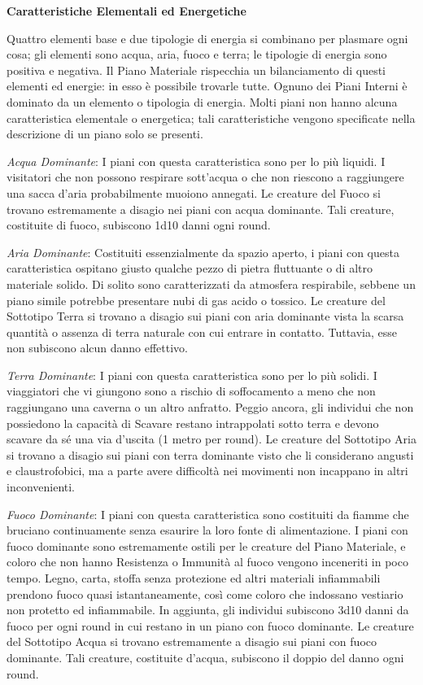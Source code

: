 \documentclass[a4paper,twoside,openany]{book}
\begin{document}
\begin{multicols}{2}
\medskip

\textbf{Caratteristiche Elementali ed Energetiche}

\medskip

Quattro elementi base e due tipologie di energia si combinano per plasmare ogni cosa; gli elementi sono acqua, aria, fuoco e terra; le tipologie di energia sono positiva e negativa. Il Piano Materiale rispecchia un bilanciamento di questi elementi ed energie: in esso è possibile trovarle tutte. Ognuno dei Piani Interni è dominato da un elemento o tipologia di energia. Molti piani non hanno alcuna caratteristica elementale o energetica; tali caratteristiche vengono specificate nella descrizione di un piano solo se presenti.

\emph{Acqua Dominante}: I piani con questa caratteristica sono per lo più liquidi. I visitatori che non possono respirare sott'acqua o che non riescono a raggiungere una sacca d'aria probabilmente muoiono annegati. Le creature del Fuoco si trovano estremamente a disagio nei piani con acqua dominante. Tali creature, costituite di fuoco, subiscono 1d10 danni ogni round.

\emph{Aria Dominante}: Costituiti essenzialmente da spazio aperto, i piani con questa caratteristica ospitano giusto qualche pezzo di pietra fluttuante o di altro materiale solido. Di solito sono caratterizzati da atmosfera respirabile, sebbene un piano simile potrebbe presentare nubi di gas acido o tossico. Le creature del Sottotipo Terra si trovano a disagio sui piani con aria dominante vista la scarsa quantità o assenza di terra naturale con cui entrare in contatto. Tuttavia, esse non subiscono alcun danno effettivo.

\emph{Terra Dominante}: I piani con questa caratteristica sono per lo più solidi. I viaggiatori che vi giungono sono a rischio di soffocamento a meno che non raggiungano una caverna o un altro anfratto. Peggio ancora, gli individui che non possiedono la capacità di Scavare restano intrappolati sotto terra e devono scavare da sé una via d'uscita (1 metro per round).
Le creature del Sottotipo Aria si trovano a disagio sui piani con terra dominante visto che li considerano angusti e claustrofobici, ma a parte avere difficoltà nei movimenti non incappano in altri inconvenienti.

\emph{Fuoco Dominante}: I piani con questa caratteristica sono costituiti da fiamme che bruciano continuamente senza esaurire la loro fonte di alimentazione. I piani con fuoco dominante sono estremamente ostili per le creature del Piano Materiale, e coloro che non hanno Resistenza o Immunità al fuoco vengono inceneriti in poco tempo. Legno, carta, stoffa senza protezione ed altri materiali infiammabili prendono fuoco quasi istantaneamente, così come coloro che indossano vestiario non protetto ed infiammabile. In aggiunta, gli individui subiscono 3d10 danni da fuoco per ogni round in cui restano in un piano con fuoco dominante. Le creature del Sottotipo Acqua si trovano estremamente a disagio sui piani con fuoco dominante. Tali creature, costituite d'acqua, subiscono il doppio del danno ogni round.


\end{multicols}
\end{document}
